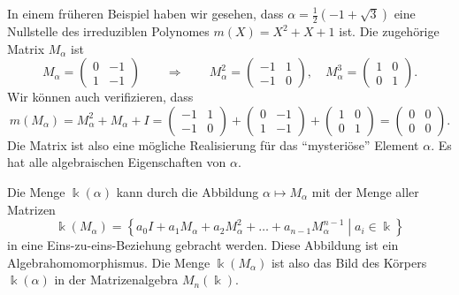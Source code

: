 \begin{beispiel}
In einem früheren Beispiel haben wir gesehen, dass
$\alpha=\frac12(-1+\sqrt{3})$ 
eine Nullstelle des irreduziblen Polynomes $m(X)=X^2+X+1$ ist.
Die zugehörige Matrix $M_\alpha$ ist
\[
M_{\alpha}
=
\begin{pmatrix}
0&-1\\
1&-1
\end{pmatrix}
\qquad\Rightarrow\qquad
M_{\alpha}^2
=
\begin{pmatrix}
-1& 1\\
-1& 0
\end{pmatrix},\quad
M_{\alpha}^3
=
\begin{pmatrix}
 1& 0\\
 0& 1
\end{pmatrix}.
\]
Wir können auch verifizieren, dass
\[
m(M_\alpha)
=
M_\alpha^2+M_\alpha+I
=
\begin{pmatrix}
-1& 1\\
-1& 0
\end{pmatrix}
+
\begin{pmatrix}
0&-1\\
1&-1
\end{pmatrix}
+
\begin{pmatrix}
1&0\\
0&1
\end{pmatrix}
=
\begin{pmatrix}
0&0\\
0&0
\end{pmatrix}.
\]
Die Matrix ist also eine mögliche Realisierung für das ``mysteriöse''
Element $\alpha$.
Es hat alle algebraischen Eigenschaften von $\alpha$.
\end{beispiel}

Die Menge $\Bbbk(\alpha)$ kann durch die Abbildung $\alpha\mapsto M_\alpha$
mit der Menge aller Matrizen
\[
\Bbbk(M_\alpha)
=
\left\{
\left.
a_0I+a_1M_\alpha+a_2M_\alpha^2+\dots+a_{n-1}M_\alpha^{n-1}\;\right|\; a_i\in\Bbbk
\right\}
\]
in eine Eins-zu-eins-Beziehung gebracht werden.
Diese Abbildung ist ein Algebrahomomorphismus.
Die Menge $\Bbbk(M_\alpha)$ ist also das Bild des
Körpers $\Bbbk(\alpha)$ in der Matrizenalgebra $M_n(\Bbbk)$.


